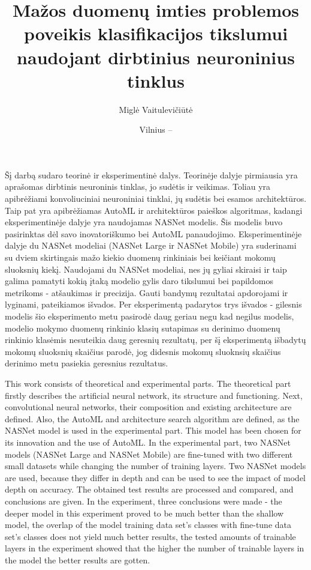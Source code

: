 \documentclass{VUMIFPSbakalaurinis}
\title{Mažos duomenų imties problemos poveikis klasifikacijos tikslumui naudojant dirbtinius neuroninius tinklus}
\author{Miglė Vaitulevičiūtė}
\date{Vilnius – \the\year}
\begin{document}
\maketitle
\cleardoublepage{}
\setcounter{page}{2}

Šį darbą sudaro teorinė ir eksperimentinė dalys. Teorinėje dalyje pirmiausia yra aprašomas dirbtinis neuroninis tinklas, jo sudėtis ir veikimas. Toliau yra apibrėžiami konvoliuciniai neuroniniai tinklai, jų sudėtis bei esamos architektūros. Taip pat yra apibrėžiamas AutoML ir architektūros paieškos algoritmas, kadangi eksperimentinėje dalyje yra naudojamas NASNet modelis. Šis modelis buvo pasirinktas dėl savo inovatoriškumo bei AutoML panaudojimo. 
Eksperimentinėje dalyje du NASNet modeliai (NASNet Large ir NASNet Mobile) yra suderinami su dviem skirtingais mažo kiekio duomenų rinkiniais bei keičiant mokomų sluoksnių kiekį. Naudojami du NASNet modeliai, nes jų gyliai skiraisi ir taip galima pamatyti kokią įtaką modelio gylis daro tikslumui bei papildomos metrikoms - atšaukimas ir precizija. 
Gauti bandymų rezultatai apdorojami ir lyginami, pateikiamos išvados. Per eksperimentą padarytos trys išvados - gilesnis modelis šio eksperimento metu pasirodė daug geriau negu kad negilus modelis, modelio mokymo duomenų rinkinio klasių sutapimas su derinimo duomenų rinkinio klasėmis nesuteikia daug geresnių rezultatų, per šį eksperimentą išbadytų mokomų sluoksnių skaičius parodė, jog didesnis mokomų sluoknsių skaičius derinimo metu pasiekia geresnius rezultatus.


This work consists of theoretical and experimental parts.  The theoretical part firstly describes the artificial neural network, its structure and functioning. Next, convolutional neural networks, their composition and existing architecture are defined. Also, the AutoML and architecture search algorithm are defined, as the NASNet model is used in the experimental part. This model has been chosen for its innovation and the use of AutoML.
In the experimental part, two NASNet models (NASNet Large and NASNet Mobile) are fine-tuned with two different small datasets while changing the number of training layers. Two NASNet models are used, because they differ in depth and can be used to see the impact of model depth on accuracy. 
The obtained test results are processed and compared, and conclusions are given. In the experiment, three conclusions were made - the deeper model in this experiment proved to be much better than the shallow model, the overlap of the model training data set's classes with fine-tune data set's classes does not yield much better results, the tested amounts of trainable layers in the experiment showed that the higher the number of trainable layers in the model the better results are gotten.
\end{document}
